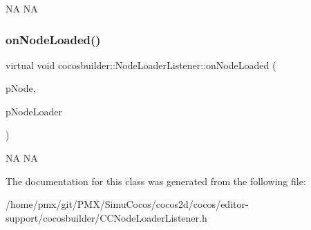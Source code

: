 NA  NA \mbox{\label{classcocosbuilder_1_1NodeLoaderListener_ac65f2d3a70f58da3df7be621e2b6f316}} 
\subsubsection{\texorpdfstring{on\+Node\+Loaded()}{onNodeLoaded()}\hspace{0.1cm}{\footnotesize\ttfamily [2/2]}}
{\footnotesize\ttfamily virtual void cocosbuilder\+::\+Node\+Loader\+Listener\+::on\+Node\+Loaded (\begin{DoxyParamCaption}\item[{cocos2d\+::\+Node $\ast$}]{p\+Node,  }\item[{\hyperlink{classcocosbuilder_1_1NodeLoader}{Node\+Loader} $\ast$}]{p\+Node\+Loader }\end{DoxyParamCaption})\hspace{0.3cm}{\ttfamily [pure virtual]}}

NA  NA 

The documentation for this class was generated from the following file\+:\begin{DoxyCompactItemize}
\item 
/home/pmx/git/\+P\+M\+X/\+Simu\+Cocos/cocos2d/cocos/editor-\/support/cocosbuilder/C\+C\+Node\+Loader\+Listener.\+h\end{DoxyCompactItemize}
